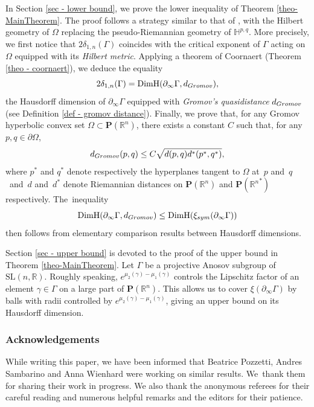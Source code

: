 \documentclass[11pt]{article}
\numberwithin{equation}{section}
\theoremstyle{definition}
\newcommand{\proj}{\mathbf{P}}
\newcommand{\R}{\mathbb{R}}
\newcommand{\Hyp}{\mathbb{H}}
\newcommand{\SL}{\mathrm{SL}}
\DeclareMathOperator{\DimH}{DimH}
\begin{document}
In Section \ref{sec - lower bound}, we prove the lower inequality of Theorem \ref{theo-MainTheorem}. The proof follows a strategy similar to that of \cite{GM18}, with the Hilbert geometry of $\Omega$ replacing the pseudo-Riemannian geometry of $\Hyp^{p,q}$. More precisely, we first notice that $2\delta_{1,n}(\Gamma)$ coincides with the critical exponent of $\Gamma$ acting on $\Omega$ equipped with its \emph{Hilbert metric}. Applying a theorem of Coornaert (Theorem \ref{theo - coornaert}), we deduce the equality\vspace*{-3pt}
\[2\delta_{1,n}(\Gamma) = \DimH(\partial_\infty \Gamma, d_{\textup{Gromov}}),\]
the Hausdorff dimension of $\partial_\infty \Gamma$ equipped with \emph{Gromov's quasidistance} $d_{\textup{Gromov}}$ (see Definition \ref{def - gromov distance}). Finally, we prove that, for any Gromov hyperbolic convex set $\Omega \subset \proj(\R^n)$, there exists a constant $C$ such that, for any $p,q\in \partial \Omega$,\vspace*{-3pt}
\[d_{\textup{Gromov}}(p,q) \leq C \sqrt{d(p,q) d^*(p^*,q^*)},\]
where $p^*$ and $q^*$ denote respectively the hyperplanes tangent to $\Omega$ at~$p$ and~$q$~and~$d$ and~$d^*$ denote Riemannian distances on $\proj(\R^n)$ and $\proj({\R^n}^*)$ respectively. The~\hbox{inequality}\vspace*{-3pt}
\[\DimH(\partial_\infty \Gamma, d_{\textup{Gromov}}) \leq \DimH(\xi_{\textit{sym}}(\partial_\infty \Gamma))\]
then follows from elementary comparison results between Hausdorff dimensions.

Section \ref{sec - upper bound} is devoted to the proof of the upper bound in Theorem \ref{theo-MainTheorem}. Let $\Gamma$ be a projective Anosov subgroup of $\SL(n,\R)$. Roughly speaking, $e^{\mu_2(\gamma)-\mu_1(\gamma)}$ controls the Lipschitz factor of an element $\gamma \in \Gamma$ on a large part of $\proj(\R^n)$. This allows us to cover $\xi(\partial_\infty \Gamma)$ by balls with radii controlled by $e^{\mu_2(\gamma)-\mu_1(\gamma)}$, giving an upper bound on its Hausdorff dimension.

\subsubsection*{Acknowledgements}
While writing this paper, we have been informed that Beatrice Pozzetti, Andres Sambarino and Anna Wienhard were working on similar results. We~thank them for sharing their work in progress. We also thank the anonymous referees for their careful reading and numerous helpful remarks and the editors for their patience.
\end{document}

